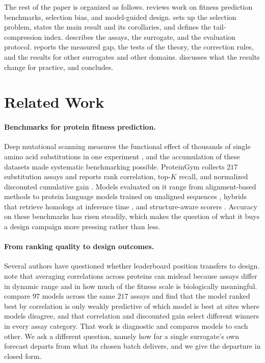 \documentclass{article}
\theoremstyle{plain}
\theoremstyle{definition}
\begin{document}
The rest of the paper is organized as follows.  reviews work on
fitness prediction benchmarks, selection bias, and model-guided design.
 sets up the selection problem, states the main result and its
corollaries, and defines the tail-compression index.  describes the
assays, the surrogate, and the evaluation protocol.  reports the
measured gap, the tests of the theory, the correction rules, and the results for other
surrogates and other domains.
 discusses what the results change for practice, and
 concludes.

\section{Related Work}
\label{sec:related}

\paragraph{Benchmarks for protein fitness prediction.}
Deep mutational scanning measures the functional effect of thousands of single amino
acid substitutions in one experiment \citep{fowler2014deep}, and the accumulation of
these datasets made systematic benchmarking possible. ProteinGym collects $217$
substitution assays and reports rank correlation, top-$K$ recall, and normalized
discounted cumulative gain \citep{notin2023proteingym}.
Models evaluated on it range from alignment-based methods \citep{hopf2017mutation,
frazer2021disease} to protein language models trained on unaligned sequences
\citep{rives2021biological, lin2023evolutionary, elnaggar2021prottrans,
madani2023large}, hybrids that retrieve homologs at inference time
\citep{notin2022tranception}, and structure-aware scorers \citep{meier2021language,
cheng2023accurate}. Accuracy on these benchmarks has risen steadily, which makes the
question of what it buys a design campaign more pressing rather than less.

\paragraph{From ranking quality to design outcomes.}
Several authors have questioned whether leaderboard position transfers to design.
\citet{notin2023proteingym} note that averaging correlations across proteins can
mislead because assays differ in dynamic range and in how much of the fitness scale is
biologically meaningful. \citet{wang2026goodfilters} compare $97$ models across the
same $217$ assays and find that the model ranked best by correlation is only weakly
predictive of which model is best at sites where models disagree, and that correlation
and discounted gain select different winners in every assay category. That work is
diagnostic and compares models to each other. We ask a different question, namely how
far a single surrogate's own forecast departs from what its chosen batch delivers, and
we give the departure in closed form.
\end{document}
